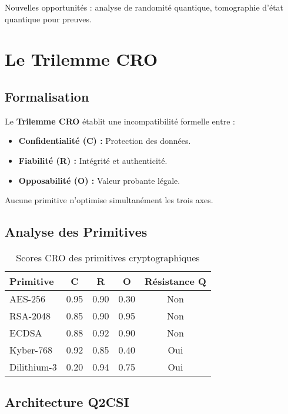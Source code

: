 \documentclass[12pt]{article}
\begin{document}
Nouvelles opportunités : analyse de randomité quantique, tomographie d'état quantique pour preuves.

\section{Le Trilemme CRO}

\subsection{Formalisation}

Le \textbf{Trilemme CRO} établit une incompatibilité formelle entre :
\begin{itemize}
    \item \textbf{Confidentialité (C) :} Protection des données.
    \item \textbf{Fiabilité (R) :} Intégrité et authenticité.
    \item \textbf{Opposabilité (O) :} Valeur probante légale.
\end{itemize}

Aucune primitive n'optimise simultanément les trois axes.

\subsection{Analyse des Primitives}

\begin{table}[h]
    \centering
    \begin{tabular}{lcccc}
        \toprule
        \textbf{Primitive} & \textbf{C} & \textbf{R} & \textbf{O} & \textbf{Résistance Q} \\
        \midrule
        AES-256 & 0.95 & 0.90 & 0.30 & Non \\
        RSA-2048 & 0.85 & 0.90 & 0.95 & Non \\
        ECDSA & 0.88 & 0.92 & 0.90 & Non \\
        Kyber-768 & 0.92 & 0.85 & 0.40 & Oui \\
        Dilithium-3 & 0.20 & 0.94 & 0.75 & Oui \\
        \bottomrule
    \end{tabular}
    \caption{Scores CRO des primitives cryptographiques}
\end{table}

\subsection{Architecture Q2CSI}
\end{document}
